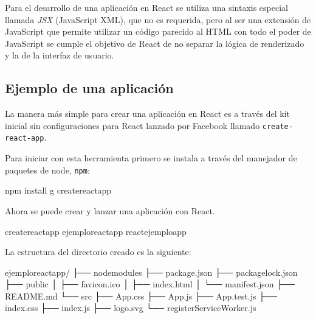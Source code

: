 Para el desarrollo de una aplicación en React se utiliza
una sintaxis especial llamada \textit{JSX} (JavaScript XML), que no
es requerida, pero al ser una extensión de JavaScript que permite
utilizar un código parecido al HTML con todo el poder de JavaScript
se cumple el objetivo de React de no separar la lógica de renderizado
y la de la interfaz de usuario.


\subsection*{Ejemplo de una aplicación}

La manera más simple para crear una aplicación en
React es a través del kit inicial sin
configuraciones para React lanzado por Facebook
llamado \texttt{create-react-app}.

Para iniciar con esta herramienta primero se instala a través del
manejador de paquetes de node, \texttt{npm}:

%
\begin{sphinxVerbatim}[commandchars=\\\{\}]
npm install \PYGZhy{}g create\PYGZhy{}react\PYGZhy{}app
\end{sphinxVerbatim}


Ahora se puede crear y lanzar una aplicación con React. 

%
\begin{sphinxVerbatim}[commandchars=\\\{\}]
create\PYGZhy{}react\PYGZhy{}app ejemplo\PYGZus{}react\PYGZus{}app
 react\PYGZus{}ejemplo\PYGZus{}app
\end{sphinxVerbatim}

La estructura del directorio creado es la siguiente:

%
\begin{sphinxVerbatim}[commandchars=\\\{\}]
ejemplo\PYGZus{}react\PYGZus{}app/
├── node\PYGZus{}modules
├── package.json
├── package\PYGZhy{}lock.json
├── public
│   ├── favicon.ico
│   ├── index.html
│   └── manifest.json
├── README.md
└── src
    ├── App.css
    ├── App.js
    ├── App.test.js
    ├── index.css
    ├── index.js
    ├── logo.svg
    └── registerServiceWorker.js
\end{sphinxVerbatim}

